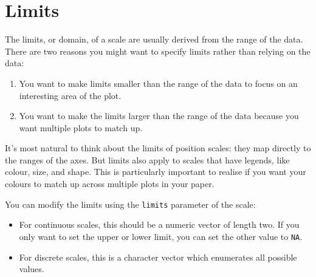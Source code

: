 \hypertarget{sec:limits}{\section{Limits}\label{sec:limits}}

The limits, or domain, of a scale are usually derived from the range of
the data.   There are two
reasons you might want to specify limits rather than relying on the
data:

\begin{enumerate}
\def\labelenumi{\arabic{enumi}.}
\item
  You want to make limits smaller than the range of the data to focus on
  an interesting area of the plot.
\item
  You want to make the limits larger than the range of the data because
  you want multiple plots to match up.
\end{enumerate}

It's most natural to think about the limits of position scales: they map
directly to the ranges of the axes. But limits also apply to scales that
have legends, like colour, size, and shape. This is particularly
important to realise if you want your colours to match up across
multiple plots in your paper.

You can modify the limits using the \texttt{limits} parameter of the
scale:

\begin{itemize}
\item
  For continuous scales, this should be a numeric vector of length two.
  If you only want to set the upper or lower limit, you can set the
  other value to \texttt{NA}.
\item
  For discrete scales, this is a character vector which enumerates all
  possible values.
\end{itemize}

\begin{Shaded}
\begin{Highlighting}[]
\StringTok{ }\NormalTok{(} \NormalTok{:}\NormalTok{, } \NormalTok{:}\NormalTok{)}
\StringTok{ }\StringTok{ }\NormalTok{() }

\StringTok{ }\NormalTok{(} \NormalTok{(}\NormalTok{, }\NormalTok{))}
\StringTok{ }\NormalTok{(} \NormalTok{(}\NormalTok{, }\NormalTok{))}
\end{Highlighting}
\end{Shaded}

